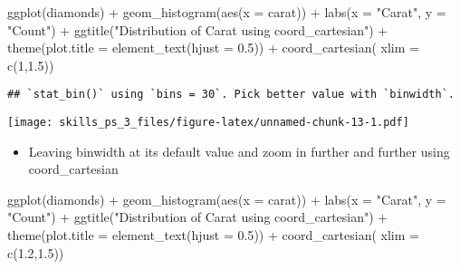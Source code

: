 \documentclass[
]{article}
\newenvironment{Shaded}{\begin{snugshade}}{\end{snugshade}}
\newcommand{\AttributeTok}[1]{\textcolor[rgb]{0.77,0.63,0.00}{#1}}
\newcommand{\DecValTok}[1]{\textcolor[rgb]{0.00,0.00,0.81}{#1}}
\newcommand{\FloatTok}[1]{\textcolor[rgb]{0.00,0.00,0.81}{#1}}
\newcommand{\FunctionTok}[1]{\textcolor[rgb]{0.00,0.00,0.00}{#1}}
\newcommand{\NormalTok}[1]{#1}
\newcommand{\SpecialCharTok}[1]{\textcolor[rgb]{0.00,0.00,0.00}{#1}}
\newcommand{\StringTok}[1]{\textcolor[rgb]{0.31,0.60,0.02}{#1}}
\providecommand{\tightlist}{%
  \setlength{\itemsep}{0pt}\setlength{\parskip}{0pt}}
\begin{document}
\begin{Shaded}
\begin{Highlighting}[]
\FunctionTok{ggplot}\NormalTok{(diamonds) }\SpecialCharTok{+} 
  \FunctionTok{geom\_histogram}\NormalTok{(}\FunctionTok{aes}\NormalTok{(}\AttributeTok{x =}\NormalTok{ carat)) }\SpecialCharTok{+}
  \FunctionTok{labs}\NormalTok{(}\AttributeTok{x =} \StringTok{"Carat"}\NormalTok{, }\AttributeTok{y =} \StringTok{"Count"}\NormalTok{) }\SpecialCharTok{+}
  \FunctionTok{ggtitle}\NormalTok{(}\StringTok{"Distribution of Carat using coord\_cartesian"}\NormalTok{) }\SpecialCharTok{+}
  \FunctionTok{theme}\NormalTok{(}\AttributeTok{plot.title =} \FunctionTok{element\_text}\NormalTok{(}\AttributeTok{hjust =} \FloatTok{0.5}\NormalTok{)) }\SpecialCharTok{+} 
  \FunctionTok{coord\_cartesian}\NormalTok{( }\AttributeTok{xlim =} \FunctionTok{c}\NormalTok{(}\DecValTok{1}\NormalTok{,}\FloatTok{1.5}\NormalTok{))}
\end{Highlighting}
\end{Shaded}

\begin{verbatim}
## `stat_bin()` using `bins = 30`. Pick better value with `binwidth`.
\end{verbatim}

\texttt{[image: skills\_ps\_3\_files/figure-latex/unnamed-chunk-13-1.pdf]}

\begin{itemize}
\tightlist
\item
  Leaving binwidth at its default value and zoom in further and further
  using coord\_cartesian
\end{itemize}

\begin{Shaded}
\begin{Highlighting}[]
\FunctionTok{ggplot}\NormalTok{(diamonds) }\SpecialCharTok{+} 
  \FunctionTok{geom\_histogram}\NormalTok{(}\FunctionTok{aes}\NormalTok{(}\AttributeTok{x =}\NormalTok{ carat)) }\SpecialCharTok{+}
  \FunctionTok{labs}\NormalTok{(}\AttributeTok{x =} \StringTok{"Carat"}\NormalTok{, }\AttributeTok{y =} \StringTok{"Count"}\NormalTok{) }\SpecialCharTok{+}
  \FunctionTok{ggtitle}\NormalTok{(}\StringTok{"Distribution of Carat using coord\_cartesian"}\NormalTok{) }\SpecialCharTok{+}
  \FunctionTok{theme}\NormalTok{(}\AttributeTok{plot.title =} \FunctionTok{element\_text}\NormalTok{(}\AttributeTok{hjust =} \FloatTok{0.5}\NormalTok{)) }\SpecialCharTok{+} 
  \FunctionTok{coord\_cartesian}\NormalTok{( }\AttributeTok{xlim =} \FunctionTok{c}\NormalTok{(}\FloatTok{1.2}\NormalTok{,}\FloatTok{1.5}\NormalTok{))}
\end{Highlighting}
\end{Shaded}
\end{document}

